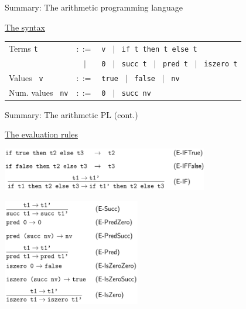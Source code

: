 \documentclass[table]{beamer}
\begin{document}
\begin{frame}[t]{Summary: The arithmetic programming language} \vspace{10pt}

\underline{The syntax}

\vspace{10pt}

\begin{tabular}{l c l }
Terms \texttt{t} & $::=$ &
	\texttt{v} \ $|$ \ \texttt{if t then t else t} \\
	& $|$ & \texttt{0} \ $|$ \ \texttt{succ t} \ $|$ \ \texttt{pred t} \ $|$ \ \texttt{iszero t} \\
Values \  \texttt{v} & $::=$ & \texttt{true} \ $|$ \ \texttt{false} \ $|$ \ \texttt{nv}\\
Num. values \ \texttt{nv} & $::=$ & \texttt{0} \ $|$ \ \texttt{succ nv}
\end{tabular}

\end{frame}

\begin{frame}[t]{Summary: The arithmetic PL (cont.)} 

\underline{The evaluation rules}

\begin{center}
\includegraphics[width=9cm]{evaluation_bool_ch3}
\end{center}

\begin{center}
\includegraphics[width=6cm]{evaluation_numeric_ch3}
\end{center}

\end{frame}
\end{document}
